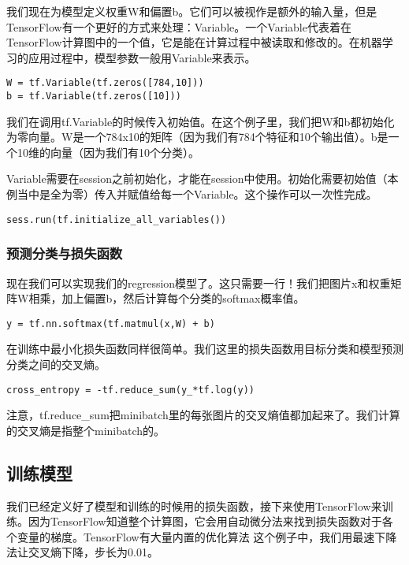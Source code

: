 我们现在为模型定义权重W和偏置b。它们可以被视作是额外的输入量，但是TensorFlow有一个更好的方式来处理：Variable。一个Variable代表着在TensorFlow计算图中的一个值，它是能在计算过程中被读取和修改的。在机器学习的应用过程中，模型参数一般用Variable来表示。

\begin{lstlisting}
W = tf.Variable(tf.zeros([784,10]))
b = tf.Variable(tf.zeros([10]))
\end{lstlisting}

我们在调用tf.Variable的时候传入初始值。在这个例子里，我们把W和b都初始化为零向量。W是一个784x10的矩阵（因为我们有784个特征和10个输出值）。b是一个10维的向量（因为我们有10个分类）。

Variable需要在session之前初始化，才能在session中使用。初始化需要初始值（本例当中是全为零）传入并赋值给每一个Variable。这个操作可以一次性完成。

\begin{lstlisting}
sess.run(tf.initialize_all_variables())
\end{lstlisting}

\subsubsection{预测分类与损失函数}
现在我们可以实现我们的regression模型了。这只需要一行！我们把图片x和权重矩阵W相乘，加上偏置b，然后计算每个分类的softmax概率值。

\begin{lstlisting}
y = tf.nn.softmax(tf.matmul(x,W) + b)
\end{lstlisting}

在训练中最小化损失函数同样很简单。我们这里的损失函数用目标分类和模型预测分类之间的交叉熵。

\begin{lstlisting}
cross_entropy = -tf.reduce_sum(y_*tf.log(y))
\end{lstlisting}

注意，tf.reduce\_sum把minibatch里的每张图片的交叉熵值都加起来了。我们计算的交叉熵是指整个minibatch的。

\subsection{训练模型}

我们已经定义好了模型和训练的时候用的损失函数，接下来使用TensorFlow来训练。因为TensorFlow知道整个计算图，它会用自动微分法来找到损失函数对于各个变量的梯度。TensorFlow有大量内置的优化算法 这个例子中，我们用最速下降法让交叉熵下降，步长为0.01。

